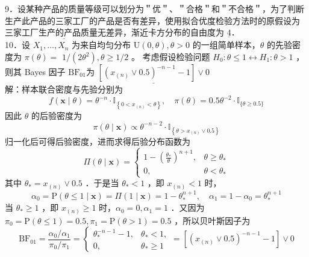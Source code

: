 \documentclass[UTF8]{ctexart}
\begin{document}
9．设某种产品的质量等级可以划分为＂优＂、＂合格＂和＂不合格＂，为了判断生产此产品的三家工厂的产品是否有差异，使用拟合优度检验方法时的原假设为 $\underline{\text{三家工厂生产的产品质量无差异}} $，渐近卡方分布的自由度为 $\underline{4}$．\\
10．设 $X_1, \ldots, X_n$ 为来自均匀分布 $\mathrm{U}(0, \theta), \theta>0$ 的一组简单样本，$\theta$ 的先验密度为 $\pi(\theta)=$ $1 /\left(2 \theta^2\right), \theta \geq 1 / 2$ 。 考虑假设检验问题 $H_0: \theta \leq 1 \leftrightarrow H_1: \theta>1$ ，则其 Bayes 因子 $\mathrm{BF}_{01}$为 $\underline{\left[\left(x_{(n)} \vee 0.5\right)^{-n-1}-1\right] \vee 0}$ \\
解：样本联合密度与先验分别为
$$
f(\boldsymbol{x} \mid \theta)=\theta^{-n} \cdot \mathbb{I}_{\left\{0<x_{(n)}<\theta\right\}}, \quad \pi(\theta)=0.5 \theta^{-2} \cdot \mathbb{I}_{\{\theta \geq 0.5\}}
$$
因此 $\theta$ 的后验密度为
$$
\pi(\theta \mid \boldsymbol{x}) \propto \theta^{-n-2} \cdot \mathbb{I}_{\left\{\theta>x_{(n)} \vee 0.5\right\}}
$$
归一化后可得后验密度，进而求得后验分布函数为
$$
\Pi(\theta \mid \boldsymbol{x})= \begin{cases}1-\left(\frac{\theta_*}{\theta}\right)^{n+1}, & \theta \geq \theta_* \\ 0, & \theta<\theta_*\end{cases}
$$
其中 $\theta_*=x_{(n)} \vee 0.5$ ．于是当 $\theta_*<1$ ，即 $x_{(n)}<1$ 时，
$$
\alpha_0=\mathrm{P}(\theta \leq 1 \mid \boldsymbol{x})=\Pi(1 \mid \boldsymbol{x})=1-\theta_*^{n+1}, \quad \alpha_1=1-\alpha_0=\theta_*^{n+1}
$$
当 $\theta_* \geq 1$ ，即 $x_{(n)} \geq 1$ 时，$\alpha_0=0, \alpha_1=1$ ．又因为 $\pi_0=\mathrm{P}(\theta \leq 1)=0.5, \pi_1=\mathrm{P}(\theta>1)=0.5$ ，所以贝叶斯因子为
$$
\mathrm{BF}_{01}=\frac{\alpha_0 / \alpha_1}{\pi_0 / \pi_1}=\left\{\begin{array}{ll}
	\theta_*^{-n-1}-1, & \theta_*<1, \\
	0, & \theta_* \geq 1
\end{array}=\left[\left(x_{(n)} \vee 0.5\right)^{-n-1}-1\right] \vee 0\right.
$$\\
\end{document}
